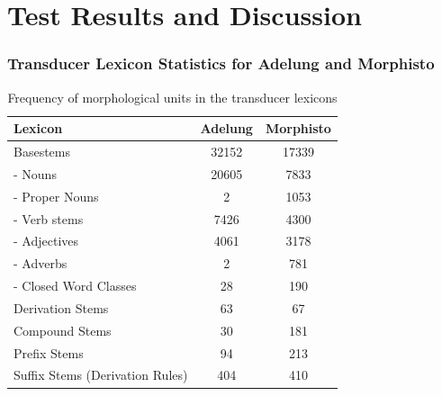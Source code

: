 \documentclass {beamer}
\begin{document}

\section{Test Results and Discussion}

\begin{frame}
\frametitle{Transducer Lexicon Statistics for Adelung and Morphisto}
\begin{small}
\begin{table}[h] 
\begin{center}
\begin{tabular}{|l|c|c|}
\hline
\textbf{Lexicon} & \textbf{Adelung} & \textbf{Morphisto} \\
\hline
\hline
Basestems &	32152 &	17339 \\
\hline
-	Nouns 	& 20605 &	7833 \\
-	Proper Nouns &	2	& 1053 \\
-	Verb stems &	7426 &	4300 \\
-	Adjectives  &	4061	& 3178 \\
-	Adverbs 	& 2	& 781 \\
-	Closed Word Classes &	28 &	190 \\
\hline
Derivation Stems & 	63 & 	67 \\
\hline
Compound Stems	& 30	 & 181 \\
\hline
Prefix Stems	& 94	& 213 \\
\hline
Suffix Stems (Derivation Rules) & 	404 & 	410 \\
\hline
\end{tabular}
\caption{Frequency of morphological units in the transducer lexicons}
\end{center}
	  \end{table} 
\end{small}
\end{frame}
\end{document}
